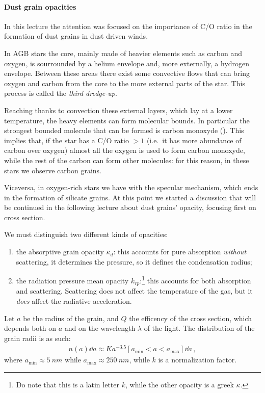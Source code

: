 \documentclass[main.tex]{subfiles}
\begin{document}
\paragraph{Dust grain opacities}

In this lecture the attention was focused on the importance of C/O ratio in the formation of dust grains in dust driven winds. 

In AGB stars the core, mainly made of heavier elements such as carbon and oxygen, is sourrounded by a helium envelope and, more externally, a hydrogen envelope. 
Between these areas there exist some convective flows that can bring oxygen and carbon from the core to the more external parts of the star. 
This process is called the \emph{third dredge-up}.

Reaching thanks to convection these external layers, which lay at a lower temperature, the heavy elements can form molecular bounds.
In particular the strongest bounded molecule that can be formed is carbon monoxyde ().
This implies that, if the star has a C/O ratio $>1$ (i.e.\ it has more abundance of carbon over oxygen) almost all the oxygen is used to form carbon monoxyde, while the rest of the carbon can form other molecules: for this reason, in these stars we observe carbon grains.

Viceversa, in oxygen-rich stars we have with the specular mechanism, which ends in the formation of silicate grains.
At this point we started a discussion that will be continued in the following lecture about dust grains' opacity, focusing first on cross section.

We must distinguish two different kinds of opacities: 
\begin{enumerate}
  \item the absorptive grain opacity \(\kappa_{d}\): this accounts for pure absorption \emph{without} scattering, it determines the pressure, so it defines the condensation radius;
  \item the radiation pressure mean opacity \(k_{rp}\):\footnote{Do note that this is a latin letter \(k\), while the other opacity is a greek \(\kappa \).} this accounts for both absorption and scattering. Scattering does not affect the temperature of the gas, but it \emph{does} affect the radiative acceleration.
\end{enumerate}

Let $a$ be the radius of the grain, and $Q$ the efficency of the cross section, which depends both on \(a\) and on the wavelength \(\lambda \) of the light.
The distribution of the grain radii is as such: 
%
\begin{align}
n(a) \dd{a} \approx K a^{-3.5} [a _{\text{min}} < a < a _{\text{max}} ] \dd{a}
\,,
\end{align}
%
where \(a _{\text{min}} \approx \SI{5}{nm}\) while \(a _{\text{max}} \approx \SI{250}{nm}\), while \(k\) is a normalization factor.
\end{document}
